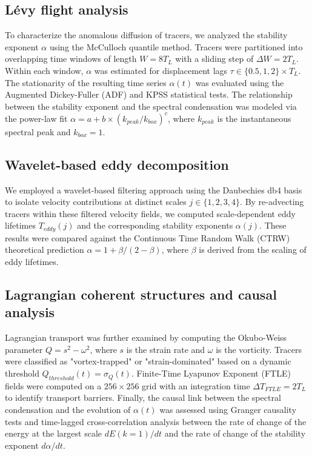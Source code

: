 \documentclass[]{article}
\begin{document}
\subsection{Lévy flight analysis}
To characterize the anomalous diffusion of tracers, we analyzed the stability exponent $\alpha$ using the McCulloch quantile method. Tracers were partitioned into overlapping time windows of length $W = 8 T_L$ with a sliding step of $\Delta W = 2 T_L$. Within each window, $\alpha$ was estimated for displacement lags $\tau \in \{0.5, 1, 2\} \times T_L$. The stationarity of the resulting time series $\alpha(t)$ was evaluated using the Augmented Dickey-Fuller (ADF) and KPSS statistical tests. The relationship between the stability exponent and the spectral condensation was modeled via the power-law fit $\alpha = a + b \times (k_{peak}/k_{box})^c$, where $k_{peak}$ is the instantaneous spectral peak and $k_{box}=1$.

\subsection{Wavelet-based eddy decomposition}
We employed a wavelet-based filtering approach using the Daubechies db4 basis to isolate velocity contributions at distinct scales $j \in \{1, 2, 3, 4\}$. By re-advecting tracers within these filtered velocity fields, we computed scale-dependent eddy lifetimes $T_{eddy}(j)$ and the corresponding stability exponents $\alpha(j)$. These results were compared against the Continuous Time Random Walk (CTRW) theoretical prediction $\alpha = 1 + \beta/(2-\beta)$, where $\beta$ is derived from the scaling of eddy lifetimes.

\subsection{Lagrangian coherent structures and causal analysis}
Lagrangian transport was further examined by computing the Okubo-Weiss parameter $Q = s^2 - \omega^2$, where $s$ is the strain rate and $\omega$ is the vorticity. Tracers were classified as "vortex-trapped" or "strain-dominated" based on a dynamic threshold $Q_{threshold}(t) = \sigma_Q(t)$. Finite-Time Lyapunov Exponent (FTLE) fields were computed on a $256 \times 256$ grid with an integration time $\Delta T_{FTLE} = 2 T_L$ to identify transport barriers. Finally, the causal link between the spectral condensation and the evolution of $\alpha(t)$ was assessed using Granger causality tests and time-lagged cross-correlation analysis between the rate of change of the energy at the largest scale $dE(k=1)/dt$ and the rate of change of the stability exponent $d\alpha/dt$.
\end{document}
